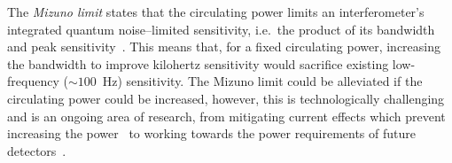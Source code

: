\label{sec:circulating_power}

The \emph{Mizuno limit} states that the circulating power limits an interferometer's integrated quantum noise--limited sensitivity, i.e.\ the product of its bandwidth and peak sensitivity~\cite{miaoFundamentalQuantumLimit2017}.
This means that, for a fixed circulating power, increasing the bandwidth to improve kilohertz sensitivity would sacrifice existing low-frequency ($\sim100$~Hz) sensitivity. %
The Mizuno limit could be alleviated if the circulating power could be increased, however, this is technologically challenging and is an ongoing area of research, from mitigating current effects which prevent increasing the power~\cite{Brooks_2021,PhysRevLett.114.161102} to working towards the power requirements of future detectors~\cite{hardwick_2019}. 
